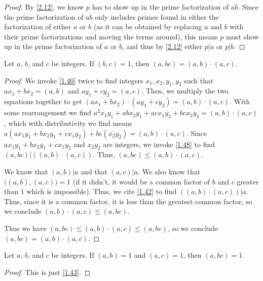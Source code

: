 \documentclass[../main.tex]{subfiles}
\begin{document}
\begin{proof}
  By \ref{2.12}, we know $p$ has to show up in the prime factorization of $ab$. Since the prime factorization of $ab$ only includes primes found in either the factorization of either $a$ or $b$ (as it can be obtained by replacing $a$ and $b$ with their prime factorizations and moving the terms around), this means $p$ must show up in the prime factorization of $a$ or $b$, and thus by \ref{2.12} either $p | a$ or $p | b$.
\end{proof}



\begin{thm} \label{2.28}
  Let $a$, $b$, and $c$ be integers. If $(b, c) = 1$, then $(a, bc) = (a,b) \cdot (a,c)$.
\end{thm}

\begin{proof}
  We invoke \ref{1.40} twice to find integers $x_1, x_2, y_1, y_2$ such that $ax_1 + bx_2 = (a,b)$ and $ay_1 + cy_2 = (a,c)$. Then, we multiply the two equations together to get $(ax_1 + bx_2) \cdot (ay_1 + cy_2) = (a,b) \cdot (a,c)$. With some rearrangement we find $a^2x_1y_1 + abx_2y_1 + acx_1y_2 + bcx_2y_2 = (a,b) \cdot (a,c)$, which with distributivity we find means $a(ax_1y_1 + bx_2y_1 + cx_1y_2) + bc(x_2y_2) = (a,b) \cdot (a,c)$.
  Since $ax_1y_1 + bx_2y_1 + cx_1y_2$ and $x_2y_2$ are integers, we invoke \ref{1.48} to find $(a,bc) | \left( (a,b) \cdot (a,c) \right)$. Thus, $(a,bc) \leq (a,b) \cdot (a,c)$.

  We know that $(a,b) | a$ and that $(a, c) | a$. We also know that $\big( (a, b) , (a, c) \big) = 1$ (if it didn't, it would be a common factor of $b$ and $c$ greater than $1$ which is impossible). Thus, we cite \ref{1.42} to find $\left( (a,b) \cdot (a, c) \right) | a$. Thus, since it is a common factor, it is less than the greatest common factor, so we conclude $(a,b) \cdot (a,c) \leq (a, bc)$.

  Thus we have $(a,bc) \leq (a,b) \cdot (a,c) \leq (a, bc)$, so we conclude $(a,bc) = (a,b) \cdot (a,c)$.
\end{proof}



\begin{thm} \label{2.29}
  Let $a$, $b$, and $c$ be integers. If $(a,b) = 1$ and $(a,c) = 1$, then $(a, bc) = 1$
\end{thm}

\begin{proof}
  This is just \ref{1.43}.
\end{proof}
\end{document}
